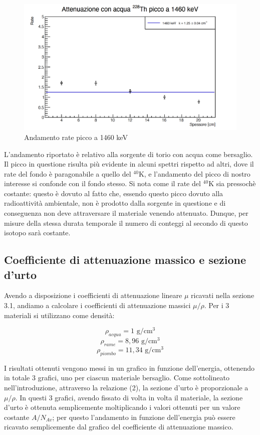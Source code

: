 \documentclass[a4paper,10pt]{article}
\newcommand*{\unit}[1]{\ensuremath{\mathrm{\,#1}}}
\begin{document}
\begin{figure}[H]
    \centering
    \includegraphics[scale=0.45]{grafici/1460keV}
    \caption{Andamento rate picco a 1460 keV}
\end{figure}

\noindent L'andamento riportato \`e relativo alla sorgente di torio con acqua come bersaglio. Il picco in questione risulta pi\`u evidente in alcuni spettri rispetto ad altri, dove il rate del fondo \`e paragonabile a quello del ${}^{40}$K, e l'andamento del picco di nostro interesse si confonde con il fondo stesso. Si nota come il rate del ${}^{40}$K sia pressoch\`e costante: questo \`e dovuto al fatto che, essendo questo picco dovuto alla radioattivit\`a ambientale, non è prodotto dalla sorgente in questione e di conseguenza non deve attraversare il materiale venendo attenuato. Dunque, per misure della stessa durata temporale il numero di conteggi al secondo di questo isotopo sarà costante.

\subsection{Coefficiente di attenuazione massico e sezione d'urto}
Avendo a disposizione i coefficienti di attenuazione lineare $\mu$ ricavati nella sezione 3.1, andiamo a calcolare i coefficienti di attenuazione massici $\mu/\rho$. Per i 3 materiali si utilizzano come densit\`a:

$$
	\rho_{acqua} = 1\, \unit{g/cm^3}
$$
$$
	\rho_{rame} = 8,96\, \unit{g/cm^3}
$$
$$
	\rho_{piombo} = 11,34\, \unit{g/cm^3}
$$

\noindent I risultati ottenuti vengono messi in un grafico in funzione dell'energia, ottenendo in totale 3 grafici, uno per ciascun materiale bersaglio. Come sottolineato nell'introduzione, attraverso la relazione (2), la sezione d'urto \`e proporzionale a $\mu/\rho$. In questi 3 grafici, avendo fissato di volta in volta il materiale, la sezione d'urto \`e ottenuta semplicemente moltiplicando i valori ottenuti per un valore costante $A/N_{Av}$; per questo l'andamento in funzione dell'energia pu\`o essere ricavato semplicemente dal grafico del coefficiente di attenuazione massico.
\end{document}
